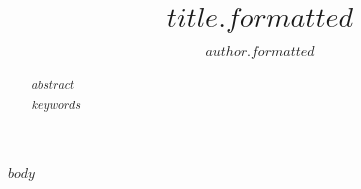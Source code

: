 \documentclass[runningheads,a4paper]{llncs}
\newcommand{\keywords}[1]{\par\addvspace\baselineskip
\noindent\keywordname\enspace\ignorespaces#1}
\begin{document}
\mainmatter
\title{$title.formatted$}

\author{$author.formatted$}


\maketitle

\begin{abstract}
  $abstract$

  \keywords{$keywords$}

\end{abstract}

$body$
\end{document}
